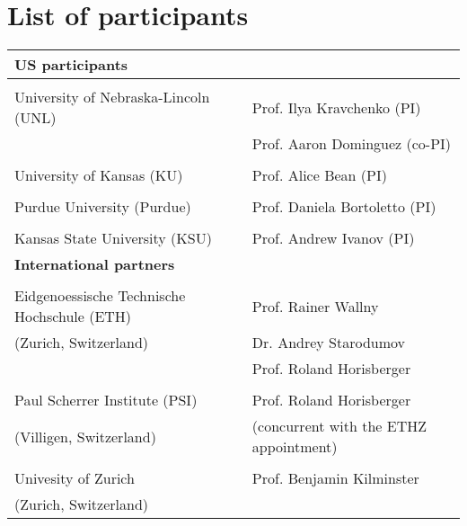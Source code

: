 \section{List of participants}

\begin{tabular}{|ll|}
\hline
{\bf US participants} & \\
\hline
 & \\
University of Nebraska-Lincoln (UNL) 
   & Prof. Ilya Kravchenko (PI)     \\
   & Prof. Aaron Dominguez (co-PI)  \\
&\\
University of Kansas (KU)
   & Prof. Alice Bean (PI) \\
&\\
Purdue University (Purdue)
   & Prof. Daniela Bortoletto (PI) \\
&\\
Kansas State University (KSU)
   & Prof. Andrew Ivanov (PI) \\
\hline
{\bf International partners} &\\
\hline
&\\
Eidgenoessische Technische Hochschule (ETH)  & Prof. Rainer Wallny \\
  (Zurich, Switzerland)                      & Dr. Andrey Starodumov \\
                                             & Prof. Roland Horisberger \\
& \\
Paul Scherrer Institute (PSI)                & Prof. Roland Horisberger \\
  (Villigen, Switzerland)                    & (concurrent with the ETHZ appointment) \\
& \\
Univesity of Zurich                          & Prof. Benjamin Kilminster \\
  (Zurich, Switzerland)   & \\
\hline
\end{tabular}

